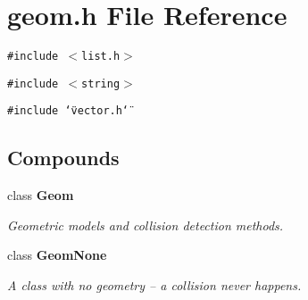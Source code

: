 \section{geom.h File Reference}
\label{geom_h}
{\tt \#include $<$list.h$>$}\par
{\tt \#include $<$string$>$}\par
{\tt \#include \char`\"{}vector.h\char`\"{}}\par
\subsection*{Compounds}
\begin{CompactItemize}
\item 
class {\bf Geom}
\begin{CompactList}\small\item\em Geometric models and collision detection methods.\item\end{CompactList}\item 
class {\bf Geom\-None}
\begin{CompactList}\small\item\em A class with no geometry -- a collision never happens.\item\end{CompactList}\end{CompactItemize}
